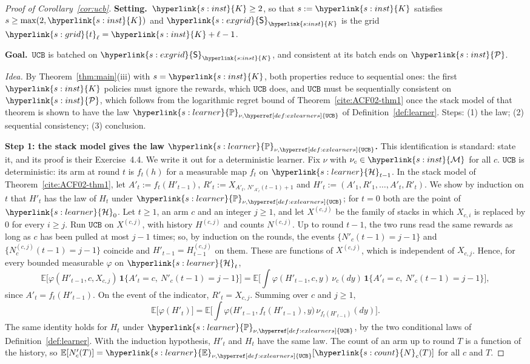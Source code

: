\documentclass[11pt]{article}
\newcommand{\sy}[2]{{\hyperlink{#1}{#2}}}
\newcommand{\E}{\mathbb{E}}
\newcommand{\1}{\mathbf{1}}
\newcommand{\Kar}{\sy{s:inst}{K}}
\newcommand{\Mu}{\sy{s:inst}{\mathcal M}}
\newcommand{\cP}{\sy{s:inst}{\mathcal P}}
\newcommand{\Hs}{\sy{s:learner}{\mathcal H}}
\newcommand{\Pnu}{\sy{s:learner}{\mathbb P}}
\newcommand{\Enu}{\sy{s:learner}{\mathbb E}}
\newcommand{\Ng}{\sy{s:count}{N}}
\newcommand{\tl}{\sy{s:grid}{t}}
\newcommand{\Sq}{\sy{s:exgrid}{\mathsf S}}
\newcommand{\UCB}{\hyperref[def:exlearners]{\texttt{UCB}}}
\newcommand{\Setting}{\noindent\textbf{Setting.}\ }
\newcommand{\Goal}{\par\smallskip\noindent\textbf{Goal.}\ }
\begin{document}
\begin{proof}[Proof of Corollary~\ref{cor:ucb}]
\Setting $\Kar\ge2$, so that $s:=\Kar$ satisfies $s\ge\max(2,\Kar)$ and $\Sq_{\Kar}$ is the grid
$\tl_\ell=\Kar+\ell-1$. \Goal $\UCB$ is batched on $\Sq_{\Kar}$, and consistent at its batch ends on
$\cP$.

\emph{Idea.} By Theorem~\ref{thm:main}(iii) with $s=\Kar$, both properties reduce to sequential
ones: the first $\Kar$ policies must ignore the rewards, which $\UCB$ does, and $\UCB$ must be
sequentially consistent on $\cP$, which follows from the logarithmic regret bound of
Theorem~\ref{cite:ACF02-thm1} once the stack model of that theorem is shown to have the law
$\Pnu_{\nu,\UCB}$ of Definition~\ref{def:learner}. Steps: (1) the law; (2) sequential consistency;
(3) conclusion.

\textbf{Step 1: the stack model gives the law $\Pnu_{\nu,\UCB}$.} This identification is standard:
\citet[Section~4.6]{LS} state it, and its proof is their Exercise~4.4. We write it out for a
deterministic learner. Fix $\nu$ with $\nu_c\in\Mu$ for all $c$. $\UCB$ is deterministic: its arm at round $t$ is $f_t(h)$ for a measurable map $f_t$ on
$\Hs_{t-1}$. In the stack model of Theorem~\ref{cite:ACF02-thm1}, let $A'_t:=f_t(H'_{t-1})$,
$R'_t:=X_{A'_t,\,N'_{A'_t}(t-1)+1}$ and $H'_t:=(A'_1,R'_1,\dots,A'_t,R'_t)$. We show by induction on
$t$ that $H'_t$ has the law of $H_t$ under $\Pnu_{\nu,\UCB}$; for $t=0$ both are the point of
$\Hs_0$. Let $t\ge1$, an arm $c$ and an integer $j\ge1$, and let $X^{(c,j)}$ be the family of
stacks in which $X_{c,i}$ is replaced by $0$ for every $i\ge j$. Run $\UCB$ on $X^{(c,j)}$, with
history $H^{(c,j)}$ and counts $N^{(c,j)}$. Up to round $t-1$, the two runs read the same rewards
as long as $c$ has been pulled at most $j-1$ times; so, by induction on the rounds, the events
$\{N'_c(t-1)=j-1\}$ and $\{N^{(c,j)}_c(t-1)=j-1\}$ coincide and $H'_{t-1}=H^{(c,j)}_{t-1}$ on them.
These are functions of $X^{(c,j)}$, which is independent of $X_{c,j}$. Hence, for every bounded
measurable $\varphi$ on $\Hs_{t}$,
\begin{equation*}
  \E\big[\varphi(H'_{t-1},c,X_{c,j})\,\1\{A'_t=c,\ N'_c(t-1)=j-1\}\big]
  =\E\Big[\int\varphi(H'_{t-1},c,y)\,\nu_c(dy)\,\1\{A'_t=c,\ N'_c(t-1)=j-1\}\Big],
\end{equation*}
since $A'_t=f_t(H'_{t-1})$. On the event of the indicator, $R'_t=X_{c,j}$. Summing over $c$ and
$j\ge1$,
\begin{equation*}
  \E\big[\varphi(H'_t)\big]=\E\Big[\int\varphi\big(H'_{t-1},f_t(H'_{t-1}),y\big)\,\nu_{f_t(H'_{t-1})}(dy)\Big].
\end{equation*}
The same identity holds for $H_t$ under $\Pnu_{\nu,\UCB}$, by the two conditional laws of
Definition~\ref{def:learner}. With the induction hypothesis, $H'_t$ and $H_t$ have the same law. The
count of an arm up to round $T$ is a function of the history, so
$\E[N'_c(T)]=\Enu_{\nu,\UCB}[\Ng_c(T)]$ for all $c$ and $T$.


\end{proof}
\end{document}
